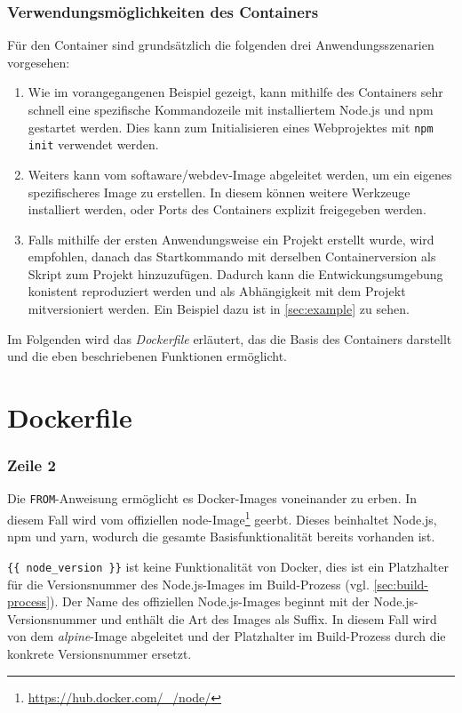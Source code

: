 \subsubsection{Verwendungsmöglichkeiten des Containers}
Für den Container sind grundsätzlich die folgenden drei Anwendungsszenarien vorgesehen:

\begin{enumerate}
    \item Wie im vorangegangenen Beispiel gezeigt, kann mithilfe des Containers sehr schnell eine spezifische Kommandozeile mit installiertem Node.js und npm gestartet werden.
        Dies kann \zB zum Initialisieren eines Webprojektes mit \verb|npm init| verwendet werden.
    \item Weiters kann vom softaware/webdev-Image abgeleitet werden, um ein eigenes spezifischeres Image zu erstellen.
        In diesem können weitere Werkzeuge installiert werden, oder Ports des Containers explizit freigegeben werden. 
    \item Falls mithilfe der ersten Anwendungsweise ein Projekt erstellt wurde, wird empfohlen, danach das Startkommando mit derselben Containerversion als Skript zum Projekt hinzuzufügen.
        Dadurch kann die Entwickungsumgebung konistent reproduziert werden und als Abhängigkeit mit dem Projekt mitversioniert werden.
        Ein Beispiel dazu ist in \cref{sec:example} zu sehen.
\end{enumerate}
Im Folgenden wird das \emph{Dockerfile} erläutert, das die Basis des Containers darstellt und die eben beschriebenen Funktionen ermöglicht.

\section{Dockerfile}
\label{sec:dockerfile}


\subsubsection{Zeile 2}
Die \verb|FROM|-Anweisung ermöglicht es Docker-Images voneinander zu erben.
In diesem Fall wird vom offiziellen node-Image\footnote{\url{https://hub.docker.com/_/node/}} geerbt.
Dieses beinhaltet Node.js, npm und yarn, wodurch die gesamte Basisfunktionalität bereits vorhanden ist.

\verb|{{ node_version }}| ist keine Funktionalität von Docker, dies ist ein Platzhalter für die Versionsnummer des Node.js-Images im Build-Prozess (vgl. \cref{sec:build-process}).
Der Name des offiziellen Node.js-Images beginnt mit der Node.js-Versionsnummer und enthält die Art des Images als Suffix.
In diesem Fall wird von dem \emph{alpine}-Image abgeleitet und der Platzhalter im Build-Prozess durch die konkrete Versionsnummer ersetzt.

